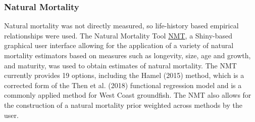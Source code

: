 \documentclass[11pt,
  english,
]{article}
\begin{document}

\hypertarget{natural-mortality}{%
\subsubsection{Natural Mortality}\label{natural-mortality}}

\leavevmode\tagmcend\tagstructend

Natural mortality was not directly measured, so life-history based empirical relationships were used. The Natural Mortality Tool {\href{https://github.com/shcaba/Natural-Mortality-Tool}{NMT}\leavevmode\tagmcend\tagstructend}, a Shiny-based graphical user interface allowing for the application of a variety of natural mortality estimators based on measures such as longevity, size, age and growth, and maturity, was used to obtain estimates of natural mortality. The NMT currently provides 19 options, including the Hamel {(2015)\leavevmode\tagmcend\tagstructend} method, which is a corrected form of the Then et al. {(2018)\leavevmode\tagmcend\tagstructend} functional regression model and is a commonly applied method for West Coast groundfish. The NMT also allows for the construction of a natural mortality prior weighted across methods by the user.
\end{document}
